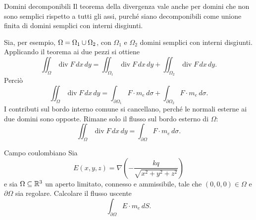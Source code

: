 \documentclass[a4paper]{article}
\begin{document}
\begin{radioactive}
\begin{snippetproposition}{Domini decomponibili}
    Il teorema della divergenza vale anche per domini che non sono semplici rispetto a tutti gli assi, purché siano decomponibili come unione finita di domini semplici con interni disgiunti.
\end{snippetproposition}
\end{radioactive}

\begin{radioactive}
\begin{snippetproof}{}
    Sia, per esempio, \(\Omega=\Omega_1\cup\Omega_2\), con \(\Omega_1\) e \(\Omega_2\) domini semplici con interni disgiunti. Applicando il teorema ai due pezzi si ottiene
    \[
        \iint_{\Omega}\operatorname{div}F\,dx\,dy
        =
        \iint_{\Omega_1}\operatorname{div}F\,dx\,dy
        +
        \iint_{\Omega_2}\operatorname{div}F\,dx\,dy.
    \]
    Perciò
    \[
        \iint_{\Omega}\operatorname{div}F\,dx\,dy
        =
        \int_{\partial\Omega_1}F\cdot m_e\,d\sigma
        +
        \int_{\partial\Omega_2}F\cdot m_e\,d\sigma.
    \]
    I contributi sul bordo interno comune si cancellano, perché le normali esterne ai due domini sono opposte. Rimane solo il flusso sul bordo esterno di \(\Omega\):
    \[
        \iint_{\Omega}\operatorname{div}F\,dx\,dy
        =
        \int_{\partial\Omega}F\cdot m_e\,d\sigma.
    \]

    \begin{center}
    \end{center}
\end{snippetproof}
\end{radioactive}

\begin{radioactive}
\begin{snippetexample}{Campo coulombiano}
    Sia
    \[
        E(x,y,z)=\nabla\left(-\frac{kq}{\sqrt{x^2+y^2+z^2}}\right)
    \]
    e sia \(\Omega\subseteq\mathbb{R}^3\) un aperto limitato, connesso e ammissibile, tale che \((0,0,0)\in\Omega\) e \(\partial\Omega\) sia regolare. Calcolare il flusso uscente
    \[
        \int_{\partial\Omega}E\cdot m_e\,dS.
    \]
\end{snippetexample}
\end{radioactive}
\end{document}
